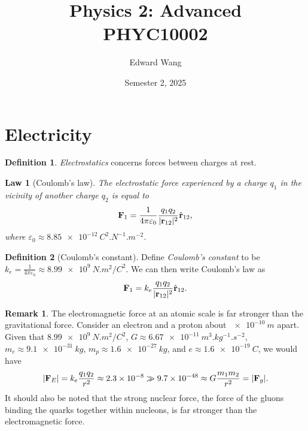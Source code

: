 \documentclass[a4paper]{scrartcl}
\newtheorem{law}{Law}
\theoremstyle{definition}
\newtheorem{definition}{Definition}
\newtheorem{remark}{Remark}
\DeclarePairedDelimiter\abs{\lvert}{\rvert}
\let\epsilon\varepsilon
\let\vec\mathbf
\begin{document}
\title{Physics 2: Advanced \\ PHYC10002}
\author{Edward Wang}
\date{Semester 2, 2025}
\maketitle

\tableofcontents

\section{Electricity}
\begin{definition}
  \emph{Electrostatics} concerns forces between charges at rest.
\end{definition}
\begin{law}[Coulomb's law]
  The electrostatic force experienced by a charge $q_1$ in the vicinity of another charge $q_2$ is equal to \[
    \vec{F}_{1} = \frac{1}{4\pi \epsilon_0} \frac{q_1q_2}{\abs{\vec{r}_{12}}^2}\hat{\vec{r}}_{12},
  \] 
  where $\epsilon_0 \approx \qty{8.85e-12}{C^2.N^{-1}.m^{-2}}$.
\end{law}
\begin{definition}[Coulomb's constant]
  Define \emph{Coulomb's constant} to be $k_e = \frac{1}{4\pi\epsilon_0} \approx \qty{8.99e9}{N.m^2/C^2}$. We can then write Coulomb's law as \[
    \vec{F}_{1} = k_e\frac{q_1q_2}{\abs{\vec{r}_{12}}^2}\hat{\vec{r}}_{12}.
  \] 
\end{definition}
\begin{remark}
  The electromagnetic force at an atomic scale is far stronger than the gravitational force. Consider an electron and a proton about $\qty{e-10}{m}$ apart. Given that $\qty{8.99e9}{N.m^2/C^2}$, $G\approx \qty{6.67e-11}{m^3.kg^{-1}.s^{-2}}$, $m_e \approx \qty{9.1e-31}{kg}$, $m_p \approx \qty{1.6e-27}{kg}$, and $e \approx \qty{1.6e-19}{C}$, we would have  \[
    \abs{\vec{F}_E} = k_e\frac{q_1q_2}{r^2} \approx 2.3 \times 10^{-8} \gg 9.7 \times 10^{-48} \approx G \frac{m_1m_2}{r^2} = \abs{\vec{F}_g}.
  \] 
  It should also be noted that the strong nuclear force, the force of the gluons binding the quarks together within nucleons, is far stronger than the electromagnetic force.
\end{remark}
\end{document}
